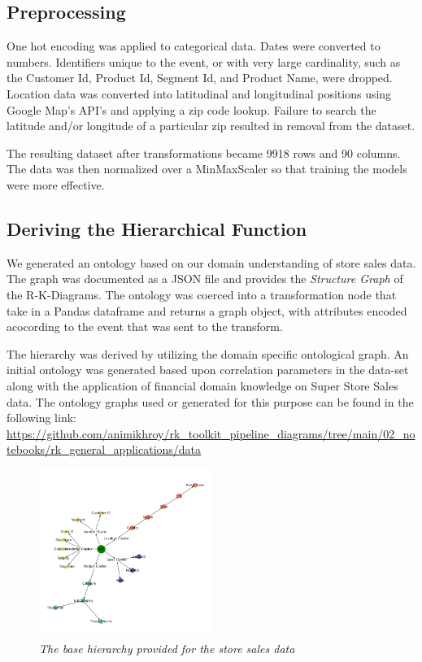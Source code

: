\subsection{Preprocessing}
\label{subsec:Preprocessing}
One hot encoding was applied to categorical data. Dates were converted to numbers. Identifiers unique to the event, or with very large cardinality, such as the Customer Id, Product Id, Segment Id, and Product Name, were dropped. Location data was converted into latitudinal and longitudinal positions using Google Map's API's and applying a zip code lookup. Failure to search the latitude and/or longitude of a particular zip resulted in removal from the dataset.

The resulting dataset after transformations became 9918 rows and 90 columns. The data was then normalized over a MinMaxScaler so that training the models were more effective.

\subsection{Deriving the Hierarchical Function}

We generated an ontology based on our domain understanding of store sales data. The graph was documented as a JSON file and provides the \textit{Structure Graph} of the R-K-Diagrams. The ontology was coerced into a transformation node that take in a Pandas dataframe and returns a graph object, with attributes encoded acocording to the event that was sent to the transform.

The hierarchy was derived by utilizing the domain specific ontological graph. An initial ontology was generated based upon correlation parameters in the data-set along with the application of financial domain knowledge on Super Store Sales data. The ontology graphs used or generated for this purpose can be found in the following link: \url{https://github.com/animikhroy/rk_toolkit_pipeline_diagrams/tree/main/02_notebooks/rk_general_applications/data}

\begin{figure}[H]
	\centering
        \includegraphics[width=0.5\textwidth]{images/base_hierarchy.png}
	\caption{\textit{The base hierarchy provided for the store sales data}}
	\label{fig:base hierarchy store sales}
\end{figure}

